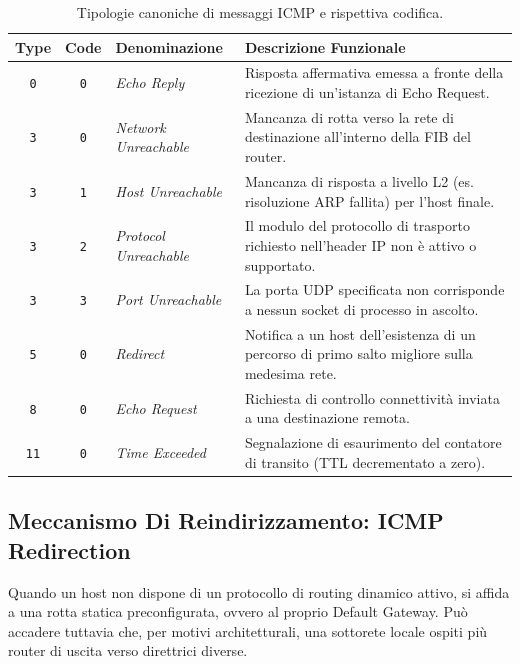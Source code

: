 \documentclass[11pt, a4paper]{article}
\begin{document}
\begin{table}[H]
\centering
\caption{Tipologie canoniche di messaggi ICMP e rispettiva codifica.}
\label{tab:icmp_types}
\begin{tabularx}{\textwidth}{c c l X}
\toprule
\textbf{Type} & \textbf{Code} & \textbf{Denominazione} & \textbf{Descrizione Funzionale} \\
\midrule
\texttt{0} & \texttt{0} & \emph{Echo Reply} & Risposta affermativa emessa a fronte della ricezione di un'istanza di Echo Request. \\
\texttt{3} & \texttt{0} & \emph{Network Unreachable} & Mancanza di rotta verso la rete di destinazione all'interno della FIB del router. \\
\texttt{3} & \texttt{1} & \emph{Host Unreachable} & Mancanza di risposta a livello L2 (es. risoluzione ARP fallita) per l'host finale. \\
\texttt{3} & \texttt{2} & \emph{Protocol Unreachable} & Il modulo del protocollo di trasporto richiesto nell'header IP non è attivo o supportato. \\
\texttt{3} & \texttt{3} & \emph{Port Unreachable} & La porta UDP specificata non corrisponde a nessun socket di processo in ascolto. \\
\texttt{5} & \texttt{0} & \emph{Redirect} & Notifica a un host dell'esistenza di un percorso di primo salto migliore sulla medesima rete. \\
\texttt{8} & \texttt{0} & \emph{Echo Request} & Richiesta di controllo connettività inviata a una destinazione remota. \\
\texttt{11} & \texttt{0} & \emph{Time Exceeded} & Segnalazione di esaurimento del contatore di transito (TTL decrementato a zero). \\
\bottomrule
\end{tabularx}
\end{table}

\subsection{Meccanismo Di Reindirizzamento: ICMP Redirection}
Quando un host non dispone di un protocollo di routing dinamico attivo, si affida a una rotta statica preconfigurata, ovvero al proprio Default Gateway. Può accadere tuttavia che, per motivi architetturali, una sottorete locale ospiti più router di uscita verso direttrici diverse.

\end{document}
